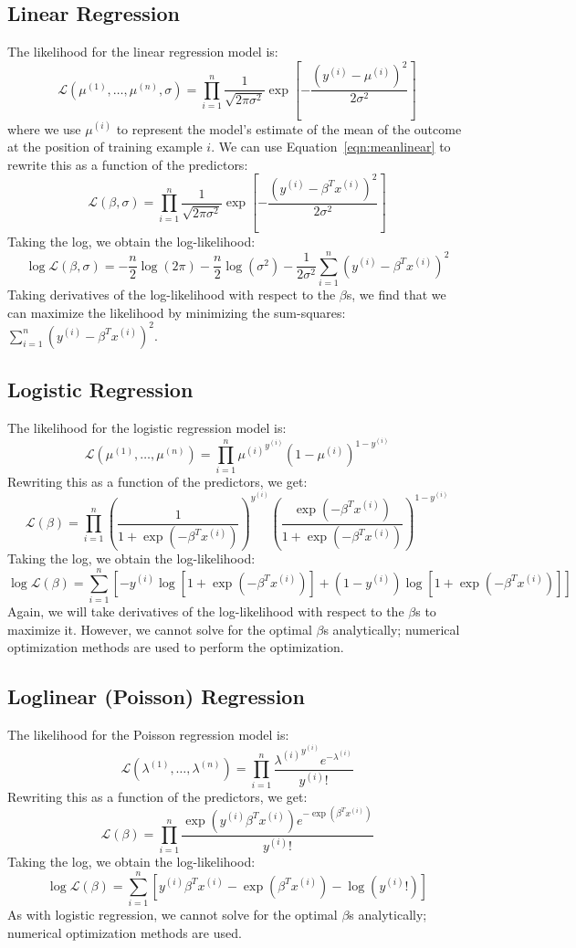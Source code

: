 \subsection{Linear Regression} 

The likelihood for the linear regression model is:
$$ \mathcal{L}(\mu^{(1)}, \dots, \mu^{(n)}, \sigma) = \prod_{i=1}^n \frac{1}{\sqrt{2 \pi \sigma^2}} \exp \left[ - \frac{(y^{(i)} - \mu^{(i)})^2}{2 \sigma^2} \right] $$
where we use $\mu^{(i)}$ to represent the model's estimate of the mean of the outcome at the position of training example $i$. We can use Equation~\ref{eqn:meanlinear} to rewrite this as a function of the predictors:
$$ \mathcal{L}(\beta, \sigma) = \prod_{i=1}^n \frac{1}{\sqrt{2 \pi \sigma^2}} \exp \left[ - \frac{(y^{(i)} - \beta^T x^{(i)})^2}{2 \sigma^2} \right] $$
Taking the log, we obtain the log-likelihood:
$$ \log \mathcal{L}(\beta, \sigma) = -\frac{n}{2} \log (2 \pi) - \frac{n}{2} \log(\sigma^2) - \frac{1}{2 \sigma^2} \sum_{i=1}^n \left( y^{(i)} - \beta^T x^{(i)} \right)^2 $$
Taking derivatives of the log-likelihood with respect to the $\beta$s, we find that we can maximize the likelihood by minimizing the sum-squares: $\sum_{i=1}^n \left( y^{(i)} - \beta^T x^{(i)} \right)^2$.

\subsection{Logistic Regression}

The likelihood for the logistic regression model is:
$$ \mathcal{L}(\mu^{(1)}, \dots, \mu^{(n)}) = \prod_{i=1}^n {\mu^{(i)}}^{y^{(i)}} (1-\mu^{(i)})^{1 - y^{(i)}} $$
Rewriting this as a function of the predictors, we get:
$$ \mathcal{L}(\beta) = \prod_{i=1}^n \left( \frac{1}{1 + \exp(-\beta^T x^{(i)})} \right)^{y^{(i)}} \left( \frac{\exp(-\beta^T x^{(i)})}{1 + \exp(-\beta^T x^{(i)})} \right)^{1 - y^{(i)}} $$
Taking the log, we obtain the log-likelihood:
$$ \log \mathcal{L}(\beta) = \sum_{i=1}^n \left[ -y^{(i)} \log \left[ 1 + \exp(-\beta^T x^{(i)}) \right] + (1 -y^{(i)}) \log \left[ 1 + \exp(-\beta^T x^{(i)}) \right] \right] $$
Again, we will take derivatives of the log-likelihood with respect to the $\beta$s to maximize it. However, we cannot solve for the optimal $\beta$s analytically; numerical optimization methods are used to perform the optimization.

\subsection{Loglinear (Poisson) Regression}

The likelihood for the Poisson regression model is:
$$ \mathcal{L}(\lambda^{(1)}, \dots, \lambda^{(n)}) = \prod_{i=1}^n \frac{{\lambda^{(i)}}^{y^{(i)}} e^{-\lambda^{(i)}}}{y^{(i)}!} $$
Rewriting this as a function of the predictors, we get:
$$ \mathcal{L}(\beta) = \prod_{i=1}^n \frac{\exp{(y^{(i)} \beta^T x^{(i)})} e^{-\exp{(\beta^T x^{(i)})}}}{y^{(i)}!} $$
Taking the log, we obtain the log-likelihood:
$$ \log \mathcal{L}(\beta) = \sum_{i=1}^n \left[ y^{(i)} \beta^T x^{(i)} - \exp(\beta^T x^{(i)}) - \log (y^{(i)}!) \right] $$
As with logistic regression, we cannot solve for the optimal $\beta$s analytically; numerical optimization methods are used. 


